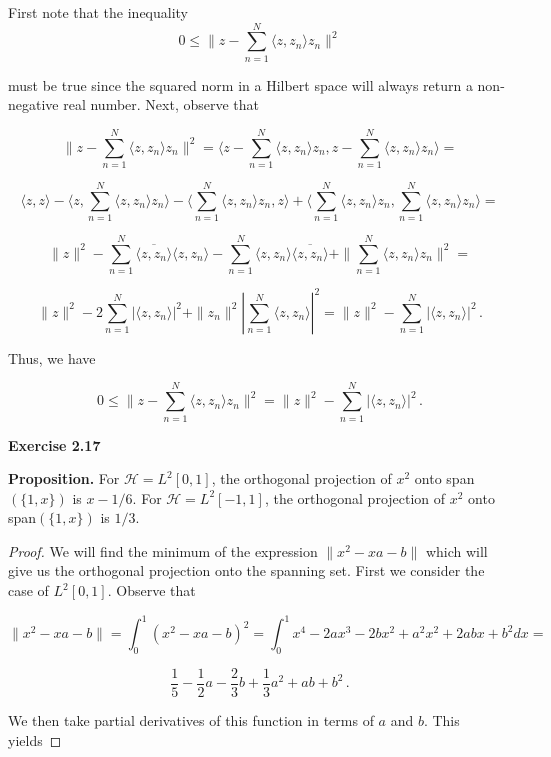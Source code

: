 \documentclass[a4paper]{article}
\numberwithin{equation}{section}
\begin{document}
\begin{description}
\item First note that the inequality 
$$0 \leq \|z - \sum_{n=1}^N\langle z,z_n \rangle z_n\|^2$$

must be true since the squared norm in a Hilbert space will always return a non-negative real number. Next, observe that 

$$\|z - \sum_{n=1}^N\langle z,z_n \rangle z_n\|^2 = \Big\langle z-\sum_{n=1}^N\langle z,z_n \rangle z_n, z -\sum_{n=1}^N\langle z,z_n \rangle z_n \Big\rangle = $$

$$\Big\langle z,z \Big\rangle - \Big\langle z,\sum_{n=1}^N\langle z,z_n \rangle z_n \Big\rangle - \Big\langle \sum_{n=1}^N\langle z,z_n \rangle z_n,z \Big\rangle + \Big\langle \sum_{n=1}^N\langle z,z_n \rangle z_n,\sum_{n=1}^N\langle z,z_n \rangle z_n \Big\rangle = $$

$$\|z\|^2 - \sum_{n=1}^N \overline{\langle z,z_n \rangle}\langle z, z_n \rangle - \sum_{n=1}^N\langle z,z_n \rangle \overline{\langle  z,z_n \rangle} + \|\sum_{n=1}^N\langle z,z_n \rangle z_n\|^2 = $$

$$\|z\|^2 - 2\sum_{n=1}^N |\langle z,z_n \rangle|^2 + \|z_n\|^2|\sum_{n=1}^N\langle z,z_n \rangle|^2 = \|z\|^2 - \sum_{n=1}^N |\langle z,z_n \rangle|^2\,.$$

Thus, we have 

$$0 \leq \|z - \sum_{n=1}^N\langle z,z_n \rangle z_n\|^2 = \|z\|^2 - \sum_{n=1}^N |\langle z,z_n \rangle|^2\,.$$

\item \textbf{Exercise 2.17}

\item \textbf{Proposition.} For $\mathcal{H} = L^2[0,1]$, the orthogonal projection of $x^2$ onto span$(\lbrace 1,x \rbrace)$ is $x-1/6$. For $\mathcal{H} = L^2[-1,1]$, the orthogonal projection of $x^2$ onto span$(\lbrace 1,x \rbrace)$ is $1/3$.

\begin{proof} We will find the minimum of the expression $\|x^2 - xa - b\|$ which will give us the orthogonal projection onto the spanning set. First we consider the case of $L^2[0,1]$. Observe that

$$\|x^2 - xa - b\| = \int_0^1 (x^2 - xa - b)^2 = \int_0^1 x^4 -2ax^3 -2bx^2+a^2x^2+2abx+b^2 dx = $$

$$\frac{1}{5} - \frac{1}{2}a - \frac{2}{3}b + \frac{1}{3}a^2 + ab + b^2\,.$$

We then take partial derivatives of this function in terms of $a$ and $b$. This yields


\end{proof}
\end{description}
\end{document}
